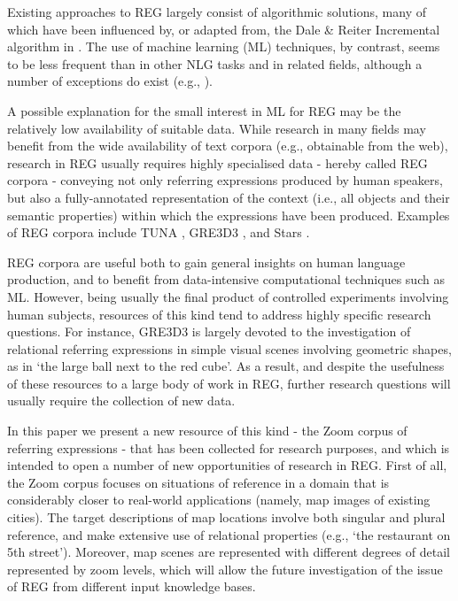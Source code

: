 \documentclass{article}
\begin{document}
Existing approaches to REG largely consist of algorithmic solutions, many of which have been influenced by, or adapted from, the Dale \& Reiter Incremental algorithm in \cite{incremental}. The use of machine learning (ML) techniques, by contrast, seems to be less frequent than in other NLG tasks and in related fields, although a number of exceptions do exist (e.g., \cite{jordan,speaker-dependent,viethen-phd,garoufi13,thiago-svm}). 

A possible explanation for the small interest in ML for REG may be the relatively low availability of suitable data. While research in many fields may benefit from the wide availability of text corpora (e.g., obtainable from the web), research in REG usually requires highly specialised data  - hereby called REG corpora - conveying not only referring expressions produced by human speakers, but also a fully-annotated representation of the context (i.e., all objects and their semantic properties) within which the expressions have been produced. Examples of REG corpora include TUNA \cite{tuna-corpus}, GRE3D3 \cite{gre3d3}, and Stars \cite{stars-mutual-disamb}. 

REG corpora are useful both to gain general insights on human  language production, and to benefit from data-intensive computational techniques such as ML. However, being usually the  final product of controlled  experiments involving human subjects, resources of this kind tend to address highly specific research questions. For instance, GRE3D3 is largely devoted to the investigation of relational referring expressions in simple visual scenes involving geometric shapes, as in `the large ball next to the red cube'. As a result, and despite the usefulness of these resources to a large body of work in REG, further research questions will usually require the collection of new data.

In this paper we present a new resource of this kind - the Zoom corpus of referring expressions - that has been collected for research purposes, and which is intended to open a number of new opportunities of research in REG. First of all, the Zoom corpus focuses on situations of reference in a domain that is considerably closer to real-world applications (namely, map images of existing cities). The target descriptions of map locations involve both singular and plural reference, and make extensive use of relational properties (e.g., `the restaurant on 5th street'). Moreover, map scenes are represented with different degrees of detail represented by zoom levels, which will allow the future investigation of the issue of REG from different input knowledge bases. 
\end{document}
